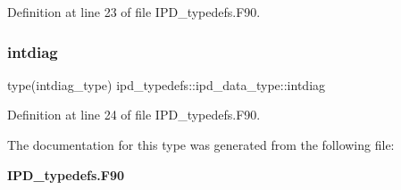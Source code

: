 Definition at line 23 of file I\+P\+D\+\_\+typedefs.\+F90.

\mbox{\label{structipd__typedefs_1_1ipd__data__type_acc7a43e96290bce656c9fed5ad68b96a}} 
\subsubsection{intdiag}
{\footnotesize\ttfamily type(intdiag\+\_\+type) ipd\+\_\+typedefs\+::ipd\+\_\+data\+\_\+type\+::intdiag}



Definition at line 24 of file I\+P\+D\+\_\+typedefs.\+F90.



The documentation for this type was generated from the following file\+:\begin{DoxyCompactItemize}
\item 
\textbf{ I\+P\+D\+\_\+typedefs.\+F90}\end{DoxyCompactItemize}
